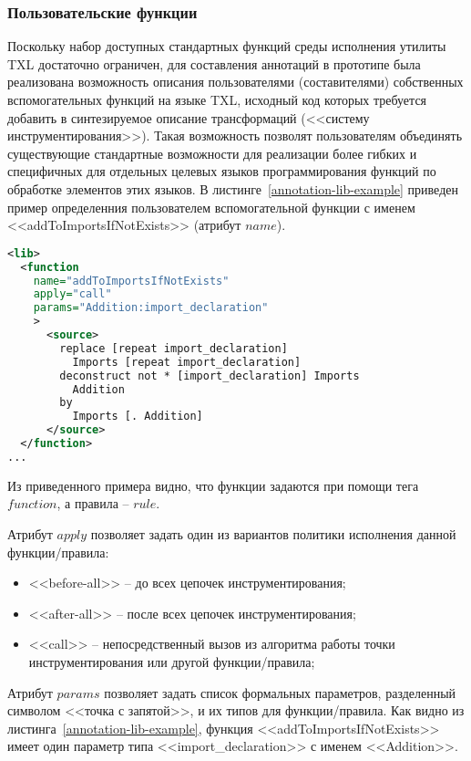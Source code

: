 \subsubsection{Пользовательские функции}

Поскольку набор доступных стандартных функций среды исполнения утилиты TXL достаточно ограничен, для составления аннотаций в прототипе была реализована возможность описания пользователями (составителями) собственных вспомогательных функций на языке TXL, исходный код которых требуется добавить в синтезируемое описание трансформаций (<<систему инструментирования>>).
Такая возможность позволят пользователям объединять существующие стандартные возможности для реализации более гибких и специфичных для отдельных целевых языков программирования функций по обработке элементов этих языков.
В листинге~\ref{annotation-lib-example} приведен пример определенния пользователем вспомогательной функции с именем <<addToImportsIfNotExists>> (атрибут $name$).

\begin{lstlisting}[frame=single, language=XML, label={annotation-lib-example}, caption={Пример описания вспомогательной функции.}]
<lib>
  <function
    name="addToImportsIfNotExists"
    apply="call"
    params="Addition:import_declaration"
    >
      <source>
        replace [repeat import_declaration]
          Imports [repeat import_declaration]
        deconstruct not * [import_declaration] Imports
          Addition
        by
          Imports [. Addition]
      </source>
  </function>
...
\end{lstlisting}

Из приведенного примера видно, что функции задаются при помощи тега $function$, а правила -- $rule$.

Атрибут $apply$ позволяет задать один из вариантов политики исполнения данной функции/правила:
\begin{itemize}[noitemsep]
  \item <<before-all>>  -- до всех цепочек инструментирования;
  \item <<after-all>>   -- после всех цепочек инструментирования;
  \item <<call>>        -- непосредственный вызов из алгоритма работы точки инструментирования или другой функции/правила;
\end{itemize}

Атрибут $params$ позволяет задать список формальных параметров, разделенный символом <<точка с запятой>>, и их типов для функции/правила.
Как видно из листинга~\ref{annotation-lib-example}, функция <<addToImportsIfNotExists>> имеет один параметр типа <<import\_declaration>> с именем <<Addition>>.

